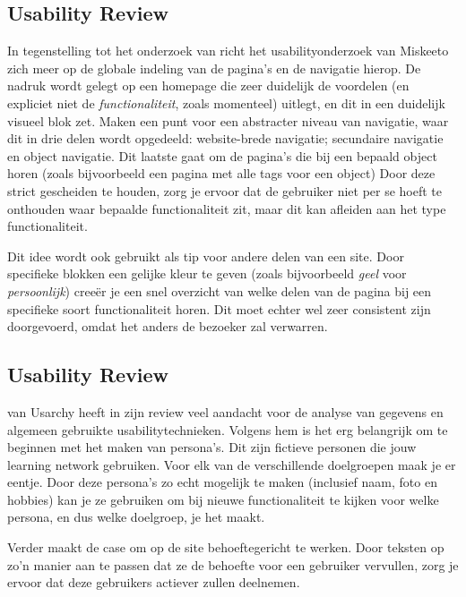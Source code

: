 \documentclass[a4paper, 10pt, pdftex]{report}
\begin{document}
    \subsection{Usability Review \citet{Hoekman2008}}
    In tegenstelling tot het onderzoek van \citeauthor{Alfrink2008} richt het usabilityonderzoek van Miskeeto zich meer op de globale indeling van de pagina's en de navigatie hierop. De nadruk wordt gelegt op een homepage die zeer duidelijk de voordelen (en expliciet niet de \emph{functionaliteit}, zoals momenteel) uitlegt, en dit in een duidelijk visueel blok zet. \citeauthor{Hoekman2008} Maken een punt voor een abstracter niveau van navigatie, waar dit in drie delen wordt opgedeeld: website-brede navigatie; secundaire navigatie en object navigatie. Dit laatste gaat om de pagina's die bij een bepaald object horen (zoals bijvoorbeeld een pagina met alle tags voor een object) Door deze strict gescheiden te houden, zorg je ervoor dat de gebruiker niet per se hoeft te onthouden waar bepaalde functionaliteit zit, maar dit kan afleiden aan het type functionaliteit.

    Dit idee wordt ook gebruikt als tip voor andere delen van een site. Door specifieke blokken een gelijke kleur te geven (zoals bijvoorbeeld \emph{geel} voor \emph{persoonlijk}) cree\"er je een snel overzicht van welke delen van de pagina bij een specifieke soort functionaliteit horen. Dit moet echter wel zeer consistent zijn doorgevoerd, omdat het anders de bezoeker zal verwarren.

    \subsection{Usability Review \citet{Timmerman2008}}
    \citeauthor{Timmerman2008} van Usarchy heeft in zijn review veel aandacht voor de analyse van gegevens en algemeen gebruikte usabilitytechnieken. Volgens hem is het erg belangrijk om te beginnen met het maken van persona's. Dit zijn fictieve personen die jouw learning network gebruiken. Voor elk van de verschillende doelgroepen maak je er eentje. Door deze persona's zo echt mogelijk te maken (inclusief naam, foto en hobbies) kan je ze gebruiken om bij nieuwe functionaliteit te kijken voor welke persona, en dus welke doelgroep, je het maakt.

    Verder maakt \citeauthor{Timmerman2008} de case om op de site behoeftegericht te werken. Door teksten op zo'n manier aan te passen dat ze de behoefte voor een gebruiker vervullen, zorg je ervoor dat deze gebruikers actiever zullen deelnemen.
\end{document}
